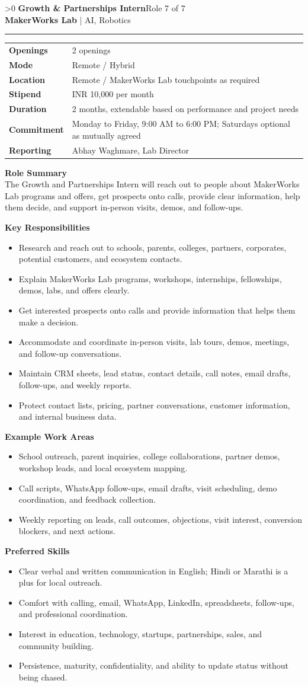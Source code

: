 \documentclass[10pt,a4paper]{article}
\newcommand{\CommonStipend}{INR 10,000 per month}
\newcommand{\CommonDuration}{2 months, extendable based on performance and project needs}
\newcommand{\CommonCommitment}{Monday to Friday, 9:00 AM to 6:00 PM; Saturdays optional as mutually agreed}
\newcommand{\CommonReporting}{Abhay Waghmare, Lab Director}
\newcounter{rolepage}
\newcommand{\RolePage}[3]{%
  \ifnum\value{rolepage}>0\clearpage\fi
  \stepcounter{rolepage}
  \thispagestyle{plain}
  {\Large\textbf{#1}}\hfill{\small #2}\\
  {\small\textbf{MakerWorks Lab} | AI, Robotics}\\[4pt]
  \hrule
  \vspace{6pt}
  #3
}
\newcommand{\DetailsTable}[3]{%
\begin{tabularx}{\linewidth}{>{\bfseries}p{30mm}X}
Openings & #3 \\
Mode & #1 \\
Location & #2 \\
Stipend & \CommonStipend \\
Duration & \CommonDuration \\
Commitment & \CommonCommitment \\
Reporting & \CommonReporting \\
\end{tabularx}
}
\newcommand{\RoleSection}[1]{\vspace{5pt}\par\noindent\textbf{#1}\par\vspace{2pt}}
\begin{document}
\RolePage{Growth \& Partnerships Intern}{Role 7 of 7}{
\DetailsTable{Remote / Hybrid}{Remote / MakerWorks Lab touchpoints as required}{2 openings}

\textbf{Role Summary}\\
The Growth and Partnerships Intern will reach out to people about MakerWorks Lab programs and offers, get prospects onto calls, provide clear information, help them decide, and support in-person visits, demos, and follow-ups.

\RoleSection{Key Responsibilities}
\begin{itemize}
  \item Research and reach out to schools, parents, colleges, partners, corporates, potential customers, and ecosystem contacts.
  \item Explain MakerWorks Lab programs, workshops, internships, fellowships, demos, labs, and offers clearly.
  \item Get interested prospects onto calls and provide information that helps them make a decision.
  \item Accommodate and coordinate in-person visits, lab tours, demos, meetings, and follow-up conversations.
  \item Maintain CRM sheets, lead status, contact details, call notes, email drafts, follow-ups, and weekly reports.
  \item Protect contact lists, pricing, partner conversations, customer information, and internal business data.
\end{itemize}

\RoleSection{Example Work Areas}
\begin{itemize}
  \item School outreach, parent inquiries, college collaborations, partner demos, workshop leads, and local ecosystem mapping.
  \item Call scripts, WhatsApp follow-ups, email drafts, visit scheduling, demo coordination, and feedback collection.
  \item Weekly reporting on leads, call outcomes, objections, visit interest, conversion blockers, and next actions.
\end{itemize}

\RoleSection{Preferred Skills}
\begin{itemize}
  \item Clear verbal and written communication in English; Hindi or Marathi is a plus for local outreach.
  \item Comfort with calling, email, WhatsApp, LinkedIn, spreadsheets, follow-ups, and professional coordination.
  \item Interest in education, technology, startups, partnerships, sales, and community building.
  \item Persistence, maturity, confidentiality, and ability to update status without being chased.
\end{itemize}

}
\end{document}
